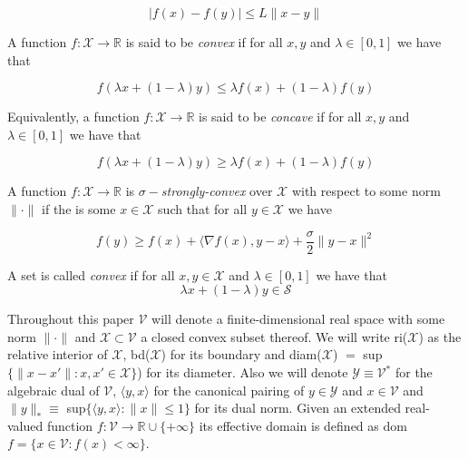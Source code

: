 \begin{equation*}
    |f(x) - f(y)| \le L\|x - y\|
\end{equation*}

A function $f:\mathcal{X} \to \mathbb{R}$ is said to be \textit{convex} if for all $x,y$ and $\lambda \in [0,1]$ we have that 

\begin{equation*}
    f(\lambda x + (1-\lambda)y) \le \lambda f(x) + (1-\lambda)f(y)
\end{equation*}

Equivalently, a function $f:\mathcal{X} \to \mathbb{R}$ is said to be \textit{concave} if for all $x,y$ and $\lambda \in [0,1]$ we have that 

\begin{equation*}
    f(\lambda x + (1-\lambda)y) \ge \lambda f(x) + (1-\lambda)f(y)
\end{equation*}

A function $f:\mathcal{X} \to \mathbb{R}$ is $\sigma-$\textit{strongly-convex} over $\mathcal{X}$ with respect to some norm $\|\cdot\|$ if the is some $x \in \mathcal{X}$ such that for all $y \in \mathcal{X}$ we have 

\begin{equation*}
    f(y) \ge f(x) + \langle\nabla f(x),y - x\rangle + \frac{\sigma}{2}\|y - x\|^2
\end{equation*}

A set is called \textit{convex} if for all $x,y \in \mathcal{X}$ and $\lambda \in [0,1]$ we have that 
\begin{equation*}
    \lambda x + (1-\lambda)y \in \mathcal{S} 
\end{equation*}

Throughout this paper $\mathcal{V}$ will denote a finite-dimensional real space with some norm $\|\cdot\|$ and $\mathcal{X} \subset \mathcal{V}$ a closed convex subset thereof. We will write ri($\mathcal{X}$) as the relative interior of $\mathcal{X}$, bd($\mathcal{X}$) for its boundary and diam($\mathcal{X}$) $ = $ sup$\{\|x-x'\|: x,x' \in \mathcal{X}\}$) for its diameter. Also we will denote $\mathcal{Y} \equiv \mathcal{V}^*$ for the algebraic dual of $\mathcal{V}$, $\langle y,x \rangle$ for the canonical pairing of $y \in \mathcal{Y}$ and $x \in \mathcal{V}$ and $\|y\|_* \equiv $ sup$\{\langle y,x \rangle: \|x\| \le 1\}$ for its dual norm. Given an extended real-valued function $f: \mathcal{V} \to \mathbb{R} \cup \{+\infty\}$ its effective domain is defined as dom$f = \{x \in \mathcal{V} : f(x) < \infty\}$.


